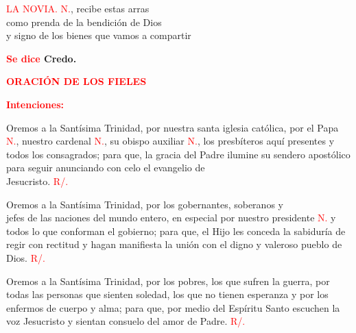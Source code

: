 \documentclass[12pt, letterpaper, spanish]{report}
\begin{document}
\textcolor{red}{LA NOVIA.} \newline
\textcolor{red}{N.}, recibe estas arras \\
como prenda de la bendici\'on de Dios \\
y signo de los bienes que vamos a compartir \newline

\Large {\bfseries \textcolor{red}{Se dice} Credo.} \newline

\newpage

\Large {\bfseries \textcolor{red}{ORACI\'ON DE LOS FIELES}} \newline

\large {\bfseries \textcolor{red}{Intenciones:}} \newline


\Large Oremos a la Sant\'isima Trinidad, por nuestra santa iglesia cat\'olica,
por el Papa \textcolor{red}{N.}, nuestro cardenal \textcolor{red}{N.}, 
su obispo auxiliar \textcolor{red}{N.}, los presb\'iteros aqu\'i 
presentes y todos los consagrados;
para que, la gracia del Padre ilumine su sendero apost\'olico
para seguir anunciando con celo el evangelio de \\
Jesucristo. \textcolor{red}{R/.}\newline


\Large Oremos a la Sant\'isima Trinidad, por los gobernantes, 
soberanos y\\ jefes de las naciones del mundo entero, en especial por 
nuestro presidente \textcolor{red}{N.} y todos lo que conforman el gobierno;
para que, el Hijo les conceda la sabidur\'ia de regir con rectitud y 
hagan manifiesta la uni\'on con el digno y valeroso pueblo de Dios.
\textcolor{red}{R/.}\newline


\Large Oremos a la Sant\'isima Trinidad, por los pobres, 
los que sufren la guerra, por todas las personas que sienten soledad, 
los que no tienen esperanza y por los enfermos de cuerpo y alma;
para que, por medio del Esp\'iritu Santo escuchen la voz Jesucristo y 
sientan consuelo del amor de Padre.
\textcolor{red}{R/.}\newline
\end{document}
